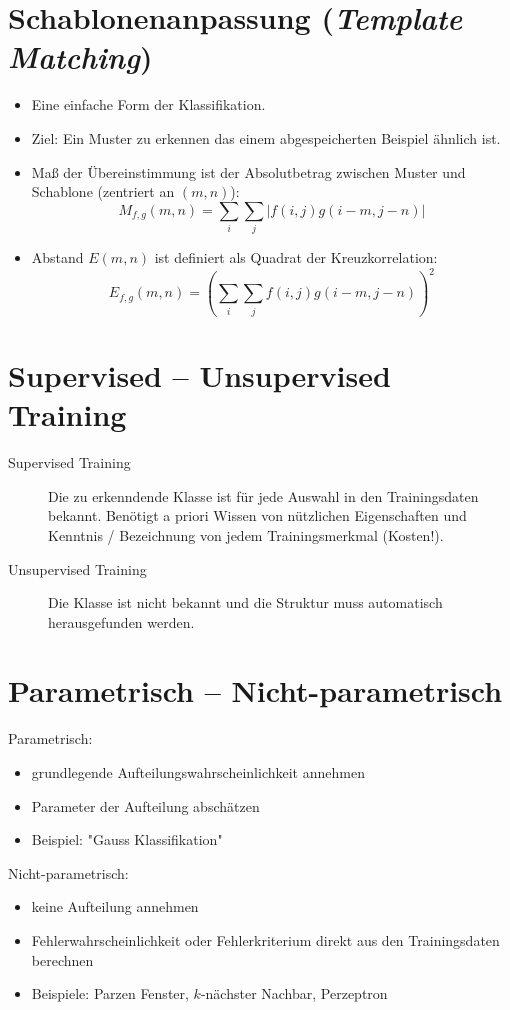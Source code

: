 \section{Schablonenanpassung (\textsl{Template Matching})}
\begin{itemize}
\item Eine einfache Form der Klassifikation.
\item Ziel: Ein Muster zu erkennen das einem abgespeicherten Beispiel ähnlich ist.
\item Maß der Übereinstimmung ist der Absolutbetrag zwischen Muster und Schablone (zentriert an $(m,n)$): $$M_{f,g}(m,n) = \sum\limits_i \sum\limits_j | f(i,j) g(i-m,j-n)|$$
\item Abstand $E(m,n)$ ist definiert als Quadrat der Kreuzkorrelation: $$E_{f,g} (m,n) = \left( \sum\limits_i \sum\limits_j f(i,j) g(i-m,j-n) \right)^2$$
\end{itemize}

\section{Supervised -- Unsupervised Training}

\begin{description}
\item[Supervised Training] Die zu erkenndende Klasse ist für jede Auswahl in den Trainingsdaten bekannt. Benötigt a priori Wissen von nützlichen Eigenschaften und Kenntnis / Bezeichnung von jedem Trainingsmerkmal (Kosten!).
\item[Unsupervised Training] Die Klasse ist nicht bekannt und die Struktur muss automatisch herausgefunden werden.
\end{description}

\section{Parametrisch -- Nicht-parametrisch}

Parametrisch:
\begin{itemize}
\item grundlegende Aufteilungswahrscheinlichkeit annehmen
\item Parameter der Aufteilung abschätzen
\item Beispiel: "{}Gauss Klassifikation"{}
\end{itemize}
Nicht-parametrisch:
\begin{itemize}
\item keine Aufteilung annehmen
\item Fehlerwahrscheinlichkeit oder Fehlerkriterium direkt aus den Trainingsdaten berechnen
\item Beispiele: Parzen Fenster, $k$-nächster Nachbar, Perzeptron
\end{itemize}


